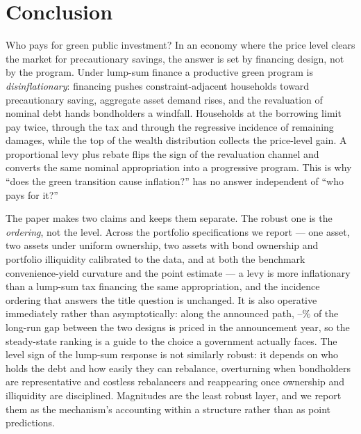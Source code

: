 \documentclass[12pt]{article}
\makeatletter
\newcommand{\FloatBarrier}{\par
    \begingroup\let\@elt\relax
    \edef\reserved@a{\@deferlist}\endgroup
    \ifx\reserved@a\@empty\else\clearpage\fi}
\providecommand{\pendingnum}{\textit{--}}
\providecommand{\OrdOne}{\pendingnum}\providecommand{\OrdTwo}{\pendingnum}
\makeatother
\begin{document}
\FloatBarrier
\section{Conclusion}\label{sec:conclusion}

Who pays for green public investment? In an economy where the price level
clears the market for precautionary savings, the answer is set by financing
design, not by the program. Under lump-sum finance a productive green
program is \emph{disinflationary}: financing pushes constraint-adjacent
households toward precautionary saving, aggregate asset demand rises, and
the revaluation of nominal debt hands bondholders a windfall. Households at
the borrowing limit pay twice, through the tax and through the regressive
incidence of remaining damages, while the top of the wealth distribution
collects the price-level gain. A proportional levy plus rebate flips the
sign of the revaluation channel and converts the same nominal appropriation
into a progressive program. This is why ``does the green transition cause
inflation?'' has no answer independent of ``who pays for it?''

The paper makes two claims and keeps them separate. The robust one is the
\emph{ordering}, not the level. Across
the portfolio specifications we report --- one asset, two assets under uniform
ownership, two assets with bond ownership and portfolio illiquidity
calibrated to the data, and at both the benchmark convenience-yield curvature
and the \citeauthor{krishnamurthy2012} point estimate --- a levy is more inflationary than a lump-sum tax financing the
same appropriation, and the incidence ordering that answers the title
question is unchanged. It is also operative immediately rather than
asymptotically: along the announced path, $\OrdOne\%$ of the long-run gap
between the two designs is priced in the announcement year, so the
steady-state ranking is a guide to the choice a government actually faces.
The level sign of the lump-sum response is not
similarly robust: it depends on who holds the debt and how easily they can
rebalance, overturning when bondholders are representative and costless
rebalancers and reappearing once ownership and illiquidity are disciplined.
Magnitudes are the least robust layer, and we report them as the mechanism's
accounting within a structure rather than as point predictions.
\end{document}
